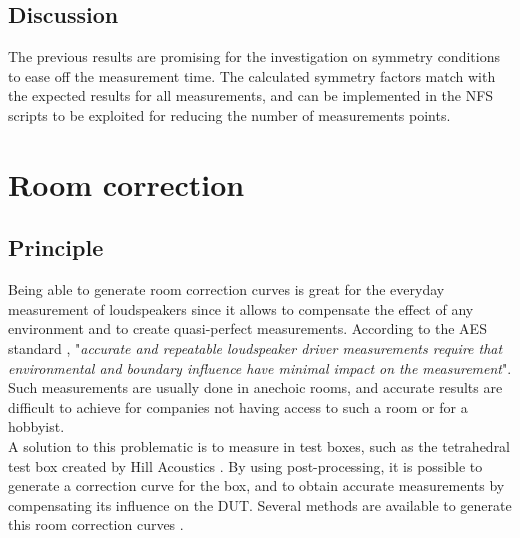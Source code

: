 \documentclass{report}
\begin{document}
\section{Discussion}

The previous results are promising for the investigation on symmetry conditions to ease off the measurement time. The calculated symmetry factors match with the expected results for all measurements, and can be implemented in the NFS scripts to be exploited for reducing the number of measurements points. 


\chapter{Room correction}

\section{Principle}

Being able to generate room correction curves is great for the everyday measurement of loudspeakers since it allows to compensate the effect of any environment and to create quasi-perfect measurements. According to the AES standard \cite{aesstandart}, "\textit{accurate and repeatable loudspeaker driver measurements require that environmental and boundary influence have minimal impact on the measurement}". Such measurements are usually done in anechoic rooms, and accurate results are difficult to achieve for companies not having access to such a room or for a hobbyist. \\

A solution to this problematic is to measure in test boxes, such as the tetrahedral test box created by Hill Acoustics \citep[see][]{tetbox}. By using post-processing, it is possible to generate a correction curve for the box, and to obtain accurate measurements by compensating its influence on the DUT. Several methods are available to generate this room correction curves \citep[see][]{aeswb}.\\
\end{document}
